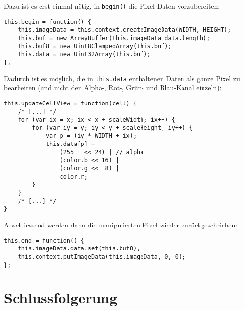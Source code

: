 \documentclass[11pt]{article} %
\theoremstyle{definition}
\begin{document}
Dazu ist es erst einmal nötig, in {\tt begin()} die Pixel-Daten vorzubereiten:

\begin{lstlisting}
this.begin = function() {
	this.imageData = this.context.createImageData(WIDTH, HEIGHT);
	this.buf = new ArrayBuffer(this.imageData.data.length);
	this.buf8 = new Uint8ClampedArray(this.buf);
	this.data = new Uint32Array(this.buf);
};
\end{lstlisting}

Dadurch ist es möglich, die in {\tt this.data} enthaltenen Daten als ganze Pixel zu bearbeiten (und nicht den Alpha-, Rot-, Grün- und Blau-Kanal einzeln):

\begin{lstlisting}
this.updateCellView = function(cell) {
	/* [...] */
	for (var ix = x; ix < x + scaleWidth; ix++) {
		for (var iy = y; iy < y + scaleHeight; iy++) {
			var p = (iy * WIDTH + ix);		
			this.data[p] =
				(255   << 24) | // alpha
				(color.b << 16) |
				(color.g <<  8) |
				color.r;
		}
	}
	/* [...] */
}
\end{lstlisting}

Abschliessend werden dann die manipulierten Pixel wieder zurückgeschrieben:

\begin{lstlisting}
this.end = function() {
	this.imageData.data.set(this.buf8);
	this.context.putImageData(this.imageData, 0, 0);
};
\end{lstlisting}

\section{Schlussfolgerung}



\end{document}
